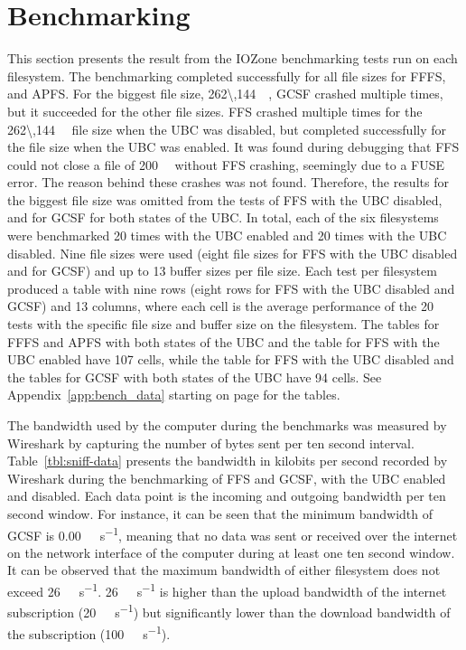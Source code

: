 \section{Benchmarking}
\label{sec:res_bench}
This section presents the result from the IOZone benchmarking tests run on each filesystem. The benchmarking completed successfully for all file sizes for \gls{FFFS}, and \gls{APFS}. For the biggest file size, \SI{262\,144}{\kilo\byte}, \gls{GCSF} crashed multiple times, but it succeeded for the other file sizes. \gls{FFS} crashed multiple times for the \SI{262\,144}{\kilo\byte} file size when the \gls{UBC} was disabled, but completed successfully for the file size when the \gls{UBC} was enabled. It was found during debugging that \gls{FFS} could not close a file of \SI{200}{\mega\byte} without \gls{FFS} crashing, seemingly due to a \gls{FUSE} error. The reason behind these crashes was not found. Therefore, the results for the biggest file size was omitted from the tests of \gls{FFS} with the \gls{UBC} disabled, and for \gls{GCSF} for both states of the \gls{UBC}. In total, each of the six filesystems were benchmarked 20 times with the \gls{UBC} enabled and 20 times with the \gls{UBC} disabled. Nine file sizes were used (eight file sizes for \gls{FFS} with the \gls{UBC} disabled and for \gls{GCSF}) and up to 13 buffer sizes per file size. Each test per filesystem produced a table with nine rows (eight rows for \gls{FFS} with the \gls{UBC} disabled and \gls{GCSF}) and 13 columns, where each cell is the average performance of the 20 tests with the specific file size and buffer size on the filesystem. The tables for \gls{FFFS} and \gls{APFS} with both states of the \gls{UBC} and the table for \gls{FFS} with the \gls{UBC} enabled have 107 cells, while the table for \gls{FFS} with the \gls{UBC} disabled and the tables for \gls{GCSF} with both states of the \gls{UBC} have 94 cells. See Appendix~\ref{app:bench_data} starting on page \pageref{app:bench_data} for the tables.

The bandwidth used by the computer during the benchmarks was measured by Wireshark by capturing the number of bytes sent per ten second interval. Table~\ref{tbl:sniff-data} presents the bandwidth in kilobits per second recorded by Wireshark during the benchmarking of \gls{FFS} and \gls{GCSF}, with the \gls{UBC} enabled and disabled. Each data point is the incoming and outgoing bandwidth per ten second window. For instance, it can be seen that the minimum bandwidth of \gls{GCSF} is \SI[per-mode = symbol]{0.00}{\kilo\byte\per\second}, meaning that no data was sent or received over the internet on the network interface of the computer during at least one ten second window. It can be observed that the maximum bandwidth of either filesystem does not exceed \SI[per-mode = symbol]{26}{\mega\bit\per\second}. \SI[per-mode = symbol]{26}{\mega\bit\per\second} is higher than the upload bandwidth of the internet subscription (\SI[per-mode = symbol]{20}{\mega\bit\per\second}) but significantly lower than the download bandwidth of the subscription (\SI[per-mode = symbol]{100}{\mega\bit\per\second}).

